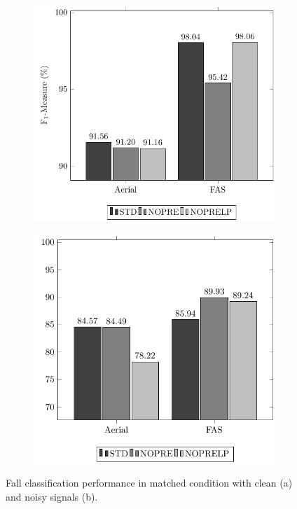 \begin{figure}[t]
	\centering
	\begin{subfigure}[b]{0.48\textwidth}
		\includegraphics[width=\textwidth]{img/pgfsources/16_matched_clean/16_matched_CLEAN.pdf}
		\caption{}\label{fig:results_match_clean}
	\end{subfigure}
	\begin{subfigure}[b]{0.45\textwidth}
		\includegraphics[width=\textwidth]{img/pgfsources/16_matched_noisy/16_matched_NOISY.pdf}
		\caption{}\label{fig:results_match_noisy}
	\end{subfigure}
	\caption{Fall classification performance in matched condition with clean (a) and noisy signals (b).} \label{fig:results_match}
\end{figure}


